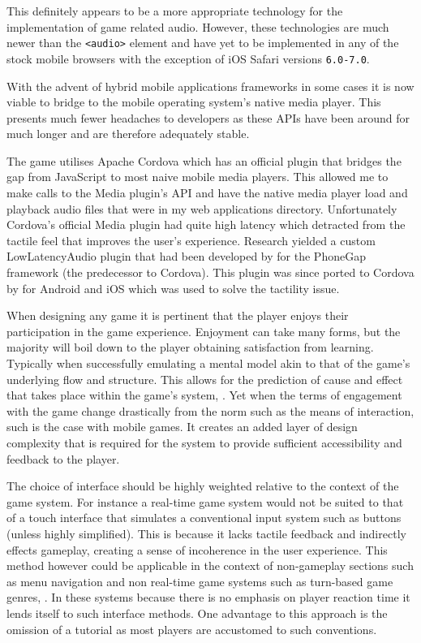 \documentclass[final]{cmpreport}
\begin{document}
This definitely appears to be a more appropriate technology for the implementation of game related audio. However, these technologies are much newer than the \texttt{<audio>} element and have yet to be implemented in any of the stock mobile browsers with the exception of iOS Safari versions \texttt{6.0-7.0\footnotemark}.


With the advent of hybrid mobile applications frameworks in some cases it is now viable to bridge to the mobile operating system's native media player. This presents much fewer headaches to developers as these APIs have been around for much longer and are therefore adequately stable.

The game utilises Apache Cordova which has an official plugin that bridges the gap from JavaScript to most naive mobile media players. This allowed me to make calls to the Media plugin's API and have the native media player load and playback audio files that were in my web applications directory. Unfortunately Cordova's official Media plugin had quite high latency which detracted from the tactile feel that improves the user's experience. Research yielded a custom LowLatencyAudio plugin that had been developed by \citep{Trice} for the PhoneGap framework (the predecessor to Cordova). This plugin was since ported to Cordova by \citep{Xie} for Android and iOS which was used to solve the tactility issue.

When designing any game it is pertinent that the player enjoys their participation in the game experience. Enjoyment can take many forms, but the majority will boil down to the player obtaining satisfaction from learning. Typically when successfully emulating a mental model akin to that of the game's underlying flow and structure. This allows for the prediction of cause and effect that takes place within the game's system, \cite{Cook}. Yet when the terms of engagement with the game change drastically from the norm such as the means of interaction, such is the case with mobile games. It creates an added layer of design complexity that is required for the system to provide sufficient accessibility and feedback to the player.

The choice of interface should be highly weighted relative to the context of the game system. For instance a real-time game system would not be suited to that of a touch interface that simulates a conventional input system such as buttons (unless highly simplified). This is because it lacks tactile feedback and indirectly effects gameplay, creating a sense of incoherence in the user experience. This method however could be applicable in the context of non-gameplay sections such as menu navigation and non real-time game systems such as turn-based game genres, \cite{XuBradburn}. In these systems because there is no emphasis on player reaction time it lends itself to such interface methods. One advantage to this approach is the omission of a tutorial as most players are accustomed to such conventions.
\end{document}
